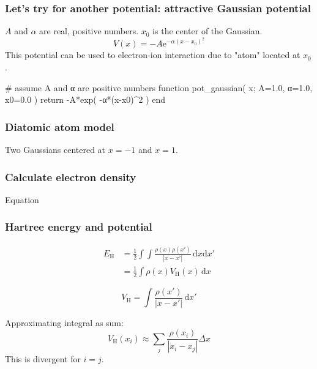 \begin{frame}[fragile]
\frametitle{Let's try for another potential: attractive Gaussian potential}

$A$ and $\alpha$ are real, positive numbers.
$x_0$ is the center of the Gaussian.
\begin{equation*}
V(x) = -A \mathrm{e}^{-\alpha (x - x_0)^2}
\end{equation*}
This potential can be used to electron-ion interaction due to "atom" located
at $x_0$.

\begin{juliacode}
# assume A and α are positive numbers
function pot_gaussian( x; A=1.0, α=1.0, x0=0.0 )
    return -A*exp( -α*(x-x0)^2 )
end
\end{juliacode}

\end{frame}


\begin{frame}
\frametitle{Diatomic atom model}

Two Gaussians centered at $x = -1$ and $x = 1$.

\end{frame}



\begin{frame}
\frametitle{Calculate electron density}

Equation

\end{frame}


\begin{frame}
\frametitle{Hartree energy and potential}

\begin{align*}
E_{\mathrm{H}} & = \frac{1}{2} \int \int \frac{\rho(x) \rho(x')}{\left| x - x' \right|}\,\mathrm{d}x \mathrm{d}x' \\
& = \frac{1}{2} \int \rho(x) V_{\mathrm{H}}(x) \, \mathrm{d}x
\end{align*}
    
\begin{equation*}
V_{\mathrm{H}} = \int \frac{\rho(x')}{\left| x - x' \right|} \, \mathrm{d}x'
\end{equation*}

Approximating integral as sum:
\begin{equation*}
V_{\mathrm{H}}(x_{i}) \approx \sum_{j} \frac{\rho(x_{i})}{ \left| x_{i} - x_{j} \right| } \Delta x
\end{equation*}
This is divergent for $i = j$.

\end{frame}


